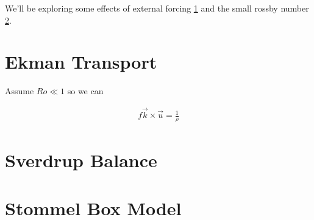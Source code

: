 We'll be exploring some effects of external forcing \ref{Ekman Transport} and the small rossby number \ref{Sverdrup Balance}.

\section{Ekman Transport}\label{Ekman Transport}

Assume $Ro\ll1$ so we can 

\begin{align}
    f\vec{k}\times\vec{u}=\frac{1}{\rho}
\end{align}

\section{Sverdrup Balance}\label{Sverdrup Balance}

\section{Stommel Box Model}\label{MOC}